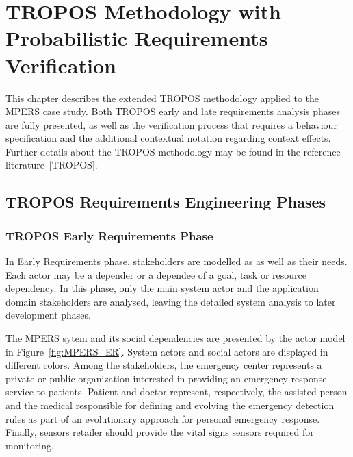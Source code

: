 \chapter{TROPOS Methodology with Probabilistic Requirements Verification}\label{ch:proposal}

This chapter describes the extended TROPOS methodology applied to the MPERS case study. Both TROPOS early and late requirements analysis phases are fully presented, as well as the verification process that requires a behaviour specification and the additional contextual notation regarding context effects. Further details about the TROPOS methodology may be found in the reference literature~[TROPOS]. 

\section{TROPOS Requirements Engineering Phases}

\subsection{TROPOS Early Requirements Phase}

In Early Requirements phase, stakeholders are modelled as as well as their needs. Each actor may be a depender or a dependee of a goal, task or resource dependency. In this phase, only the main system actor and the application domain stakeholders are analysed, leaving the detailed system analysis to later development phases.

The MPERS sytem and its social dependencies are presented by the actor model in Figure~\ref{fig:MPERS_ER}. System actors and social actors are displayed in different colors. Among the stakeholders, the emergency center represents a private or public organization interested in providing an emergency response service to patients. Patient and doctor represent, respectively, the assisted person and the medical responsible for defining and evolving the emergency detection rules as part of an evolutionary approach for personal emergency response. Finally, sensors retailer should provide the vital signs sensors required for monitoring.

